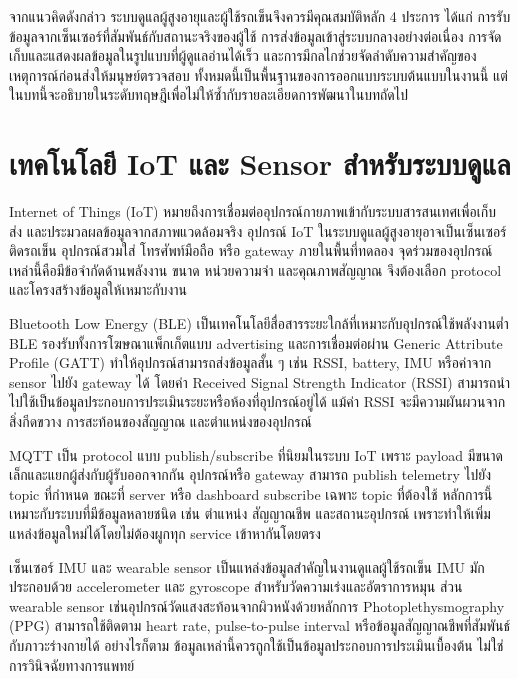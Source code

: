จากแนวคิดดังกล่าว ระบบดูแลผู้สูงอายุและผู้ใช้รถเข็นจึงควรมีคุณสมบัติหลัก 4 ประการ ได้แก่ การรับข้อมูลจากเซ็นเซอร์ที่สัมพันธ์กับสถานะจริงของผู้ใช้ การส่งข้อมูลเข้าสู่ระบบกลางอย่างต่อเนื่อง การจัดเก็บและแสดงผลข้อมูลในรูปแบบที่ผู้ดูแลอ่านได้เร็ว และการมีกลไกช่วยจัดลำดับความสำคัญของเหตุการณ์ก่อนส่งให้มนุษย์ตรวจสอบ ทั้งหมดนี้เป็นพื้นฐานของการออกแบบระบบต้นแบบในงานนี้ แต่ในบทนี้จะอธิบายในระดับทฤษฎีเพื่อไม่ให้ซ้ำกับรายละเอียดการพัฒนาในบทถัดไป

\section{เทคโนโลยี IoT และ Sensor สำหรับระบบดูแล}
\label{sec:ch2_iot_sensor}

Internet of Things (IoT) หมายถึงการเชื่อมต่ออุปกรณ์กายภาพเข้ากับระบบสารสนเทศเพื่อเก็บ ส่ง และประมวลผลข้อมูลจากสภาพแวดล้อมจริง อุปกรณ์ IoT ในระบบดูแลผู้สูงอายุอาจเป็นเซ็นเซอร์ติดรถเข็น อุปกรณ์สวมใส่ โทรศัพท์มือถือ หรือ gateway ภายในพื้นที่ทดลอง จุดร่วมของอุปกรณ์เหล่านี้คือมีข้อจำกัดด้านพลังงาน ขนาด หน่วยความจำ และคุณภาพสัญญาณ จึงต้องเลือก protocol และโครงสร้างข้อมูลให้เหมาะกับงาน \cite{Atzori2010IoTSurvey}

Bluetooth Low Energy (BLE) เป็นเทคโนโลยีสื่อสารระยะใกล้ที่เหมาะกับอุปกรณ์ใช้พลังงานต่ำ BLE รองรับทั้งการโฆษณาแพ็กเก็ตแบบ advertising และการเชื่อมต่อผ่าน Generic Attribute Profile (GATT) ทำให้อุปกรณ์สามารถส่งข้อมูลสั้น ๆ เช่น RSSI, battery, IMU หรือค่าจาก sensor ไปยัง gateway ได้ โดยค่า Received Signal Strength Indicator (RSSI) สามารถนำไปใช้เป็นข้อมูลประกอบการประเมินระยะหรือห้องที่อุปกรณ์อยู่ได้ แม้ค่า RSSI จะมีความผันผวนจากสิ่งกีดขวาง การสะท้อนของสัญญาณ และตำแหน่งของอุปกรณ์ \cite{BluetoothSIGLEPrimer}

MQTT เป็น protocol แบบ publish/subscribe ที่นิยมในระบบ IoT เพราะ payload มีขนาดเล็กและแยกผู้ส่งกับผู้รับออกจากกัน อุปกรณ์หรือ gateway สามารถ publish telemetry ไปยัง topic ที่กำหนด ขณะที่ server หรือ dashboard subscribe เฉพาะ topic ที่ต้องใช้ หลักการนี้เหมาะกับระบบที่มีข้อมูลหลายชนิด เช่น ตำแหน่ง สัญญาณชีพ และสถานะอุปกรณ์ เพราะทำให้เพิ่มแหล่งข้อมูลใหม่ได้โดยไม่ต้องผูกทุก service เข้าหากันโดยตรง \cite{MQTTSpec,Mishra2018_MQTT_survey}

เซ็นเซอร์ IMU และ wearable sensor เป็นแหล่งข้อมูลสำคัญในงานดูแลผู้ใช้รถเข็น IMU มักประกอบด้วย accelerometer และ gyroscope สำหรับวัดความเร่งและอัตราการหมุน ส่วน wearable sensor เช่นอุปกรณ์วัดแสงสะท้อนจากผิวหนังด้วยหลักการ Photoplethysmography (PPG) สามารถใช้ติดตาม heart rate, pulse-to-pulse interval หรือข้อมูลสัญญาณชีพที่สัมพันธ์กับภาวะร่างกายได้ \cite{PolarBLESDK,PolarVeritySenseWhitepaper} อย่างไรก็ตาม ข้อมูลเหล่านี้ควรถูกใช้เป็นข้อมูลประกอบการประเมินเบื้องต้น ไม่ใช่การวินิจฉัยทางการแพทย์

